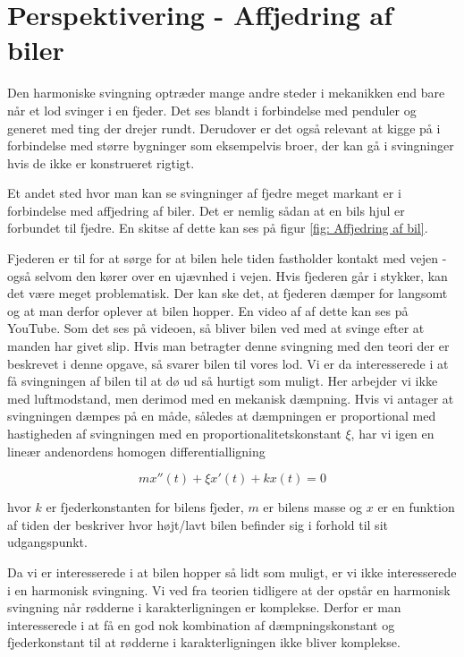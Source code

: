 \chapter{Perspektivering - Affjedring af biler}
Den harmoniske svingning optræder mange andre steder i mekanikken end bare når et lod svinger i en fjeder.
Det ses blandt i forbindelse med penduler og generet med ting der drejer rundt.
Derudover er det også relevant at kigge på i forbindelse med større bygninger som eksempelvis broer, der kan gå i svingninger hvis de ikke er konstrueret rigtigt. 

Et andet sted hvor man kan se svingninger af fjedre meget markant er i forbindelse med affjedring af biler. 
Det er nemlig sådan at en bils hjul er forbundet til fjedre. 
En skitse af dette kan ses på figur \ref{fig: Affjedring af bil}.


Fjederen er til for at sørge for at bilen hele tiden fastholder kontakt med vejen - også selvom den kører over en ujævnhed i vejen. 
Hvis fjederen går i stykker, kan det være meget problematisk. 
Der kan ske det, at fjederen dæmper for langsomt og at man derfor oplever at bilen hopper.
En video af af dette kan ses på YouTube.
Som det ses på videoen, så bliver bilen ved med at svinge efter at manden har givet slip. 
Hvis man betragter denne svingning med den teori der er beskrevet i denne opgave, så svarer bilen til vores lod.
Vi er da interesserede i at få svingningen af bilen til at dø ud så hurtigt som muligt. 
Her arbejder vi ikke med luftmodstand, men derimod med en mekanisk dæmpning. 
Hvis vi antager at svingningen dæmpes på en måde, således at dæmpningen er proportional med hastigheden af svingningen med en proportionalitetskonstant $\xi$, har vi igen en lineær andenordens homogen differentialligning

\begin{equation}
mx''(t)+\xi x'(t) + k x(t) = 0
\end{equation}

hvor $k$ er fjederkonstanten for bilens fjeder, $m$ er bilens masse og $x$ er en funktion af tiden der beskriver hvor højt/lavt bilen befinder sig i forhold til sit udgangspunkt.

Da vi er interesserede i at bilen hopper så lidt som muligt, er vi ikke interesserede i en harmonisk svingning. 
Vi ved fra teorien tidligere at der opstår en harmonisk svingning når rødderne i karakterligningen er komplekse. 
Derfor er man interesserede i at få en god nok kombination af dæmpningskonstant og fjederkonstant til at rødderne i karakterligningen ikke bliver komplekse. 

